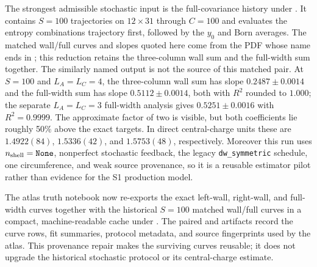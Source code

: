 \documentclass[aps,prx,twocolumn,floatfix,nofootinbib,superscriptaddress,longbibliography]{revtex4-2}
\newcommand{\code}[1]{\texttt{#1}}
\begin{document}
The strongest admissible stochastic input is the full-covariance history under
.  It contains $S=100$ trajectories on
$12\times31$ through $C=100$ and evaluates the entropy combinations trajectory first,
followed by the $y_0$ and Born averages.  The matched wall/full curves and slopes quoted
here come from the PDF whose name ends in
; this reduction retains the
three-column wall sum and the full-width sum together.  The similarly named
 output is not the
source of this matched pair.  At $S=100$ and $L_A=L_C=4$, the three-column wall sum has slope
$0.2487\pm0.0014$ and the full-width sum has slope $0.5112\pm0.0014$, both with
$R^2$ rounded to $1.000$; the separate $L_A=L_C=3$ full-width analysis gives
$0.5251\pm0.0016$ with $R^2=0.9999$.  The approximate factor of two is visible, but both
coefficients lie roughly 50\% above the exact targets.  In direct central-charge units
these are $1.4922(84)$, $1.5336(42)$, and $1.5753(48)$, respectively.  Moreover this run uses
$n_{\rm shell}=\texttt{None}$, nonperfect stochastic feedback, the legacy
\code{dw\_symmetric} schedule, one circumference, and weak source provenance, so it is a
reusable estimator pilot rather than evidence for the S1 production model.

The atlas truth notebook now re-exports the exact left-wall, right-wall, and full-width
curves together with the historical $S=100$ matched wall/full curves in a compact,
machine-readable cache under
.  The paired
 and
 artifacts record the curve rows,
fit summaries, protocol metadata, and source fingerprints used by the atlas.  This
provenance repair makes the surviving curves reusable; it does not upgrade the historical
stochastic protocol or its central-charge estimate.
\end{document}
